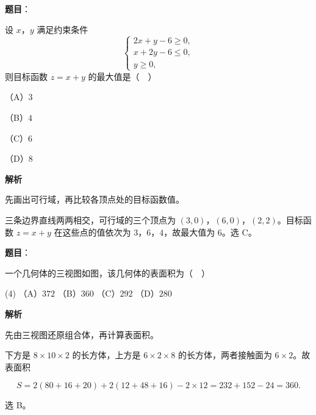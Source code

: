 \begin{answer}

\textbf{题目}：

设 $x$，$y$ 满足约束条件
\nopagebreak[4]
\[\begin{cases}2x+y-6\geqslant0,\\ x+2y-6\leqslant0,\\ y\geqslant0,\end{cases}\]
则目标函数 $z=x+y$ 的最大值是（　）

（A）$3$

（B）$4$

（C）$6$

（D）$8$

\textbf{解析}

先画出可行域，再比较各顶点处的目标函数值。

三条边界直线两两相交，可行域的三个顶点为 $(3,0)$，$(6,0)$，$(2,2)$。目标函数 $z=x+y$ 在这些点的值依次为 $3$，$6$，$4$，故最大值为 $6$。选 C。


\end{answer}
\begin{answer}

\textbf{题目}：

一个几何体的三视图如图，该几何体的表面积为（　）
\nopagebreak[4]
\begin{center}\end{center}
\nopagebreak[4]
\begin{gkopts}(4)
\task （A）$372$
\task （B）$360$
\task （C）$292$
\task （D）$280$
\end{gkopts}

\textbf{解析}

先由三视图还原组合体，再计算表面积。

下方是 $8\times10\times2$ 的长方体，上方是 $6\times2\times8$ 的长方体，两者接触面为 $6\times2$。故表面积

\nopagebreak[4]
\[S=2(80+16+20)+2(12+48+16)-2\times12=232+152-24=360.\]

选 B。


\end{answer}
